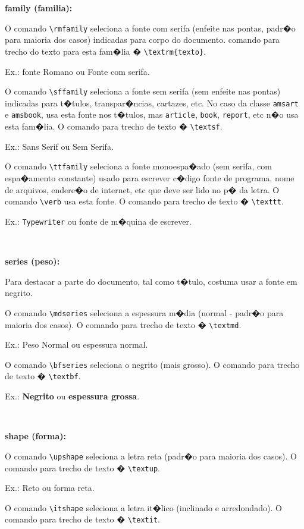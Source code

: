 \documentclass[12pt,a4paper]{article}
\begin{document}
{\bfseries family (familia):}

O comando \verb|\rmfamily| seleciona a fonte com serifa 
(enfeite nas pontas, padr�o para maioria dos casos) 
indicadas para corpo do documento. 
comando para trecho do texto para esta fam�lia � \verb+\textrm{texto}+.

Ex.: \textrm{fonte Romano} ou {\rmfamily Fonte com serifa}.

O comando \verb|\sffamily| seleciona a fonte sem serifa 
(sem enfeite nas pontas) indicadas para t�tulos, 
transpar�ncias, cartazes, etc. 
No caso da classe \texttt{amsart} e \texttt{amsbook}, usa esta fonte 
nos t�tulos, mas \texttt{article}, \texttt{book}, \texttt{report}, etc 
n�o usa esta fam�lia.
O comando para trecho de texto � \verb+\textsf+.

Ex.: \textsf{Sans Serif} ou {\sffamily Sem Serifa}.

O comando \verb|\ttfamily| seleciona a fonte monoespa�ado (sem serifa, 
com espa�amento constante) usado para escrever c�digo fonte de programa,
nome de arquivos, endere�o de internet, etc que deve ser lido no p� da letra.
O comando \verb|\verb| usa esta fonte.
O comando para trecho de texto � \verb+\texttt+.

Ex.: \texttt{Typewriter} ou {\ttfamily fonte de m�quina de escrever}.

\

{\bfseries series (peso):}

Para destacar a parte do documento, tal como t�tulo, 
costuma usar a fonte em negrito.

O comando \verb|\mdseries| seleciona a espessura m�dia 
(normal - padr�o para maioria dos casos).
O comando para trecho de texto � \verb+\textmd+.


Ex.: \textmd{Peso Normal} ou {\mdseries espessura normal}.


O comando \verb|\bfseries| seleciona o negrito (mais grosso).
O comando para trecho de texto � \verb+\textbf+.


Ex.: \textbf{Negrito} ou {\bfseries espessura grossa}.

\

{\bfseries shape (forma):}

O comando \verb|\upshape| seleciona a letra reta (padr�o para maioria dos casos).
O comando para trecho de texto � \verb+\textup+.

Ex.: \textup{Reto} ou {\upshape forma reta}.

O comando \verb|\itshape| seleciona a letra it�lico (inclinado e arredondado).
O comando para trecho de texto � \verb+\textit+.
\end{document}
